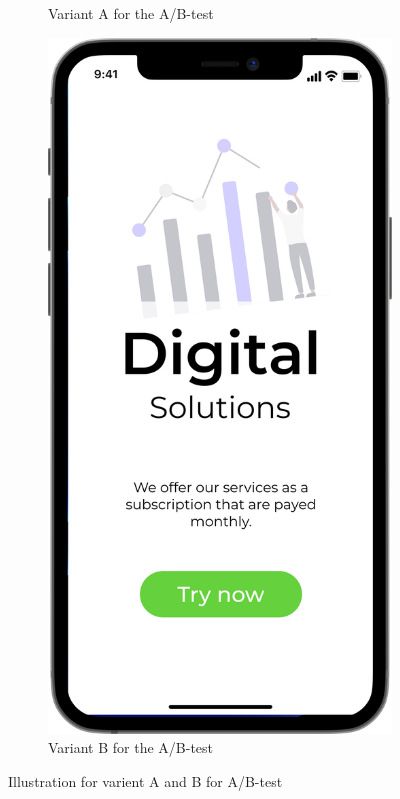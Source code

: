 \begin{figure}[H]
\begin{subfigure}[b]{0.45\textwidth}
    \caption{Variant A for the A/B-test}
    \label{fig:images/A}
  \end{subfigure}
  \hfill
  \begin{subfigure}[b]{0.45\textwidth}
    \includegraphics[width=\linewidth]{images/B.png}
    \caption{Variant B for the A/B-test}
    \label{fig:images/B}
  \end{subfigure}

  \caption{Illustration for varient A and B for A/B-test}
  \label{fig:VariantsForABtest}
\end{figure}


